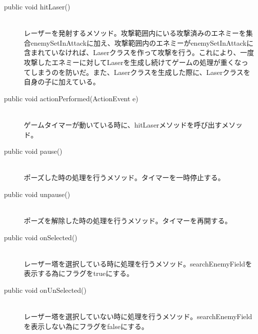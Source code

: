 \documentclass[11pt,a4j]{jarticle}
\begin{document}
\begin{description}
\begin{description}
              \item[public void hitLaser()] \mbox{}\\
                    レーザーを発射するメソッド。攻撃範囲内にいる攻撃済みのエネミーを集合enemySetInAttackに加え、攻撃範囲内のエネミーがenemySetInAttackに含まれていなければ、Laserクラスを作って攻撃を行う。これにより、一度攻撃したエネミーに対してLaserを生成し続けてゲームの処理が重くなってしまうのを防いだ。また、Laserクラスを生成した際に、Laserクラスを自身の子に加えている。
              \item[public void actionPerformed(ActionEvent e)] \mbox{}\\
                    ゲームタイマーが動いている時に、hitLaserメソッドを呼び出すメソッド。
              \item[public void pause()] \mbox{}\\
                    ポーズした時の処理を行うメソッド。タイマーを一時停止する。
              \item[public void unpause()] \mbox{}\\
                    ポーズを解除した時の処理を行うメソッド。タイマーを再開する。
              \item[public void onSelected()] \mbox{}\\
                    レーザー塔を選択している時に処理を行うメソッド。searchEnemyFieldを表示する為にフラグをtrueにする。
              \item[public void onUnSelected()] \mbox{}\\
                    レーザー塔を選択していない時に処理を行うメソッド。searchEnemyFieldを表示しない為にフラグをfalseにする。

          \end{description}
\end{description}
\end{document}
